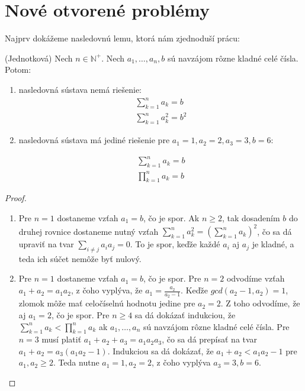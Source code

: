 \chapter{Nové otvorené problémy}

\label{kap:newproblems} %

Najprv dokážeme nasledovnú lemu, ktorá nám zjednoduší prácu:

\begin{lemma} (Jednotková) Nech $n \in \mathbb{N^+}$. Nech $a_1, \dots , a_n , b$ sú navzájom rôzne kladné celé čísla. Potom:

\begin{enumerate}
\item nasledovná sústava nemá riešenie:
\begin{gather*}
\sum_{k=1}^{n} a_k = b \\
\sum_{k=1}^{n} a^2_k = b^2
\end{gather*}

\item nasledovná sústava má jediné riešenie pre $a_1 = 1, a_2 = 2, a_3 = 3, b = 6$:

\begin{gather*}
\sum_{k=1}^{n} a_k = b \\
\prod_{k=1}^{n} a_k = b
\end{gather*}
\end{enumerate}

\end{lemma}

\begin{proof}
\begin{enumerate}
\item Pre $n = 1$ dostaneme vzťah $a_1 = b$, čo je spor. Ak $n \geq 2$, tak dosadením $b$ do druhej rovnice dostaneme nutný vzťah $\sum_{k=1}^{n} a^2_k = (\sum_{k=1}^{n} a_k)^2$, čo sa dá upraviť na tvar $\sum_{i \neq j} a_i a_j = 0$. To je spor, keďže každé $a_i$ aj $a_j$ je kladné, a teda ich súčet nemôže byť nulový. \\

\item Pre $n = 1$ dostaneme vzťah $a_1 = b$, čo je spor. Pre $n = 2$ odvodíme vzťah $a_1 + a_2 = a_1 a_2$, z čoho vyplýva, že $a_1 = \frac{a_2}{a_2 - 1}$. Keďže $gcd(a_2 - 1, a_2) = 1$, zlomok môže mať celočíselnú hodnotu jedine pre $a_2 = 2$. Z toho odvodíme, že aj $a_1 = 2$, čo je spor. Pre $n \geq 4$ sa dá dokázať indukciou, že $\sum_{k=1}^{n} a_k < \prod_{k=1}^{n} a_k$ ak $a_1, \dots , a_n$ sú navzájom rôzne kladné celé čísla. Pre $n = 3$ musí platiť $a_1 + a_2 + a_3 = a_1 a_2 a_3$, čo sa dá prepísať na tvar $a_1 + a_2 = a_3 (a_1 a_2 - 1)$. Indukciou sa dá dokázať, že $a_1 + a_2 < a_1 a_2 - 1$ pre $a_1, a_2 \geq 2$. Teda nutne $a_1 = 1, a_2 = 2$, z čoho vyplýva $a_3 = 3, b = 6$.
\end{enumerate}
\end{proof}


